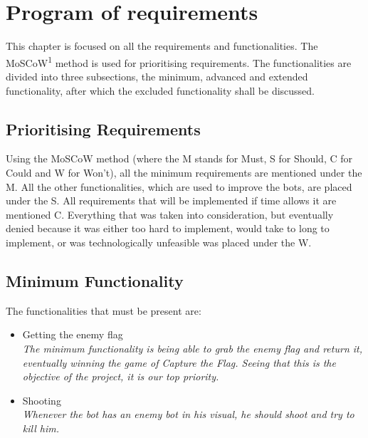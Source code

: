 \chapter{Program of requirements}
This chapter is focused on all the requirements and functionalities. The MoSCoW\textsuperscript{1} method is used for prioritising requirements. The functionalities are divided into three subsections, the minimum, advanced and extended functionality, after which the excluded functionality shall be discussed.
\section{Prioritising Requirements}
Using the MoSCoW method (where the M stands for Must, S for Should, C for Could and W for Won't), all the minimum requirements are mentioned under the M. All the other functionalities, which are used to improve the bots, are placed under the S. All requirements that will be implemented if time allows it are mentioned C. Everything that was taken into consideration, but eventually denied because it was either too hard to implement, would take to long to implement, or was technologically unfeasible was placed under the W.\\


\section{Minimum Functionality}
The functionalities that must be present are:
\begin{itemize}
	\item Getting the enemy flag \\
		\textit{The minimum functionality is being able to grab the enemy flag and return it, eventually winning the game of Capture the Flag. Seeing that this is the objective of the project, it is our top priority.}
	\item Shooting \\
		\textit{Whenever the bot has an enemy bot in his visual, he should shoot and try to kill him.}
\end{itemize}

